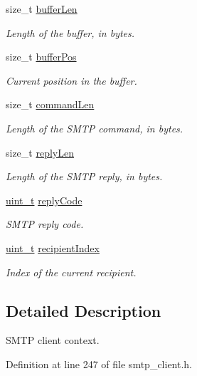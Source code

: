 \begin{DoxyCompactItemize}
size\+\_\+t \hyperlink{struct__SmtpClientContext_a749fb7b9249105b493ae7e63623e6e04}{buffer\+Len}
\begin{DoxyCompactList}\small\item\em Length of the buffer, in bytes. \end{DoxyCompactList}\item 
size\+\_\+t \hyperlink{struct__SmtpClientContext_ae276846168abb52ec32644fe33dc8ec0}{buffer\+Pos}
\begin{DoxyCompactList}\small\item\em Current position in the buffer. \end{DoxyCompactList}\item 
size\+\_\+t \hyperlink{struct__SmtpClientContext_a6040a7456bd6c44460d6690ba23ff833}{command\+Len}
\begin{DoxyCompactList}\small\item\em Length of the S\+M\+TP command, in bytes. \end{DoxyCompactList}\item 
size\+\_\+t \hyperlink{struct__SmtpClientContext_a513e65e0472f8ed23cac5286bb0654d9}{reply\+Len}
\begin{DoxyCompactList}\small\item\em Length of the S\+M\+TP reply, in bytes. \end{DoxyCompactList}\item 
\hyperlink{compiler__port_8h_a12a1e9b3ce141648783a82445d02b58d}{uint\+\_\+t} \hyperlink{struct__SmtpClientContext_aab1f5c5a03c3f5ba832af9284b1a87ca}{reply\+Code}
\begin{DoxyCompactList}\small\item\em S\+M\+TP reply code. \end{DoxyCompactList}\item 
\hyperlink{compiler__port_8h_a12a1e9b3ce141648783a82445d02b58d}{uint\+\_\+t} \hyperlink{struct__SmtpClientContext_a733bd5d651b06a123f941d864caacf89}{recipient\+Index}
\begin{DoxyCompactList}\small\item\em Index of the current recipient. \end{DoxyCompactList}\end{DoxyCompactItemize}


\subsection{Detailed Description}
S\+M\+TP client context. 

Definition at line 247 of file smtp\+\_\+client.\+h.




